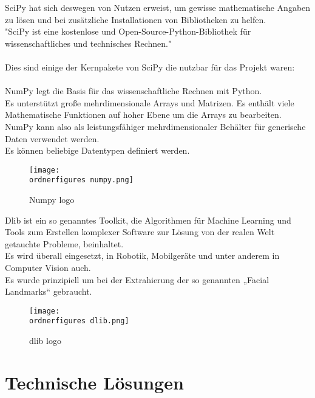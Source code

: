 SciPy hat sich deswegen von Nutzen erweist, um gewisse mathematische Angaben zu lösen und bei zusätzliche Installationen von Bibliotheken zu helfen.\\ 
"SciPy ist eine kostenlose und Open-Source-Python-Bibliothek für wissenschaftliches und technisches Rechnen."\\\cite{2019arXiv190710121V-scipy}
 \\ 
Dies sind einige der Kernpakete von SciPy die nutzbar für das Projekt waren:\\ 
 \\ 
NumPy legt die Basis für das wissenschaftliche Rechnen mit Python.\\ Es unterstützt große mehrdimensionale Arrays und Matrizen. Es enthält viele Mathematische Funktionen auf hoher Ebene um die Arrays zu bearbeiten.\\
NumPy kann also als leistungsfähiger mehrdimensionaler Behälter für generische Daten verwendet werden.\\ Es können beliebige Datentypen definiert werden.
\\
\begin{figure}[H]
	\texttt{[image: \\ordnerfigures numpy.png]}
	\caption{Numpy logo}
	\label{fig:Numpy logo}
	\cite{Numpy}
\end{figure}

Dlib ist ein so genanntes Toolkit, die Algorithmen für Machine Learning und Tools zum Erstellen komplexer Software zur Lösung von der realen Welt getauchte Probleme, beinhaltet.\\
Es wird überall eingesetzt, in Robotik, Mobilgeräte und unter anderem in Computer Vision auch.\cite{dlib} \\
Es wurde prinzipiell um bei der Extrahierung der so genannten „Facial Landmarks“ gebraucht. \\

\begin{figure}[H]
	\texttt{[image: \\ordnerfigures dlib.png]}
	\caption{dlib logo}
	\cite{dlib}
	\label{fig:dlib logo}
\end{figure}


\section{Technische Lösungen}

